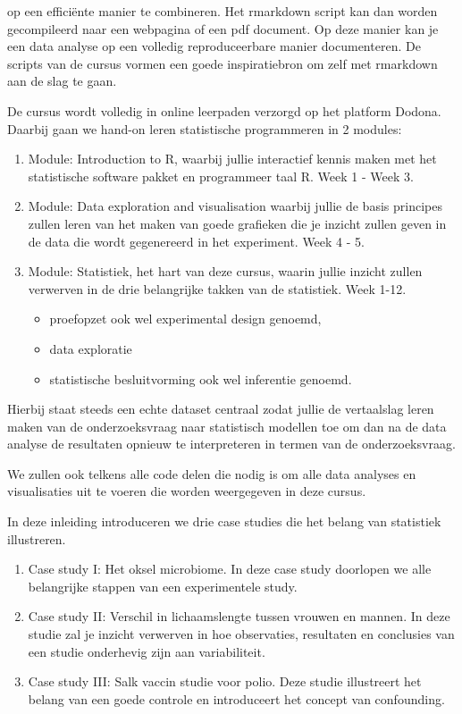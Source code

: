 \documentclass[
  dutch,
  letterpaper,
  12pt]{book}
\providecommand{\tightlist}{%
  \setlength{\itemsep}{0pt}\setlength{\parskip}{0pt}}
\theoremstyle{definition}
\theoremstyle{definition}
\theoremstyle{definition}
\theoremstyle{remark}
\begin{document}
op een efficiënte manier te combineren. Het rmarkdown script kan dan
worden gecompileerd naar een webpagina of een pdf document. Op deze
manier kan je een data analyse op een volledig reproduceerbare manier
documenteren. De scripts van de cursus vormen een goede inspiratiebron
om zelf met rmarkdown aan de slag te gaan.

De cursus wordt volledig in online leerpaden verzorgd op het platform
Dodona. Daarbij gaan we hand-on leren statistische programmeren in 2
modules:

\begin{enumerate}
\def\labelenumi{\arabic{enumi}.}
\item
  Module: Introduction to R, waarbij jullie interactief kennis maken met
  het statistische software pakket en programmeer taal R. Week 1 - Week
  3.
\item
  Module: Data exploration and visualisation waarbij jullie de basis
  principes zullen leren van het maken van goede grafieken die je
  inzicht zullen geven in de data die wordt gegenereerd in het
  experiment. Week 4 - 5.
\item
  Module: Statistiek, het hart van deze cursus, waarin jullie inzicht
  zullen verwerven in de drie belangrijke takken van de statistiek. Week
  1-12.

  \begin{itemize}
  \tightlist
  \item
    proefopzet ook wel experimental design genoemd,
  \item
    data exploratie
  \item
    statistische besluitvorming ook wel inferentie genoemd.
  \end{itemize}
\end{enumerate}

Hierbij staat steeds een echte dataset centraal zodat jullie de
vertaalslag leren maken van de onderzoeksvraag naar statistisch modellen
toe om dan na de data analyse de resultaten opnieuw te interpreteren in
termen van de onderzoeksvraag.

We zullen ook telkens alle code delen die nodig is om alle data analyses
en visualisaties uit te voeren die worden weergegeven in deze cursus.

In deze inleiding introduceren we drie case studies die het belang van
statistiek illustreren.

\begin{enumerate}
\def\labelenumi{\arabic{enumi}.}
\item
  Case study I: Het oksel microbiome. In deze case study doorlopen we
  alle belangrijke stappen van een experimentele study.
\item
  Case study II: Verschil in lichaamslengte tussen vrouwen en mannen. In
  deze studie zal je inzicht verwerven in hoe observaties, resultaten en
  conclusies van een studie onderhevig zijn aan variabiliteit.
\item
  Case study III: Salk vaccin studie voor polio. Deze studie illustreert
  het belang van een goede controle en introduceert het concept van
  confounding.
\end{enumerate}
\end{document}
